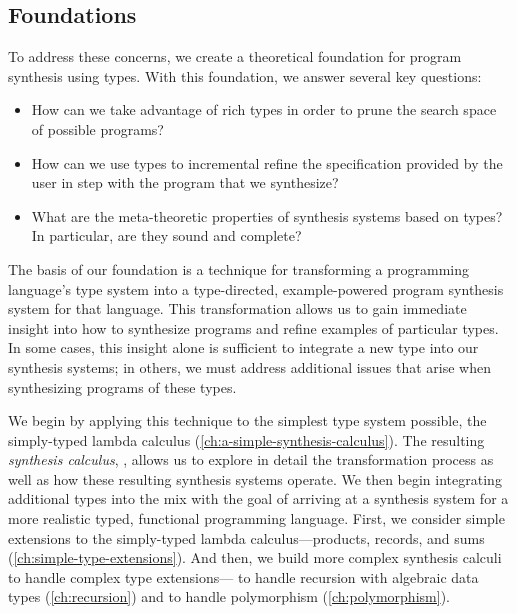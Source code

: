 \subsection{Foundations}
To address these concerns, we create a theoretical foundation for program synthesis using types.
With this foundation, we answer several key questions:
\begin{itemize}
  \item How can we take advantage of rich types in order to prune the search space of possible programs?
  \item How can we use types to incremental refine the specification provided by the user in step with the program that we synthesize?
  \item What are the meta-theoretic properties of synthesis systems based on types?  In particular, are they sound and complete?
\end{itemize}
The basis of our foundation is a technique for transforming a programming language's type system into a type-directed, example-powered program synthesis system for that language.
This transformation allows us to gain immediate insight into how to synthesize programs and refine examples of particular types.
In some cases, this insight alone is sufficient to integrate a new type into our synthesis systems; in others, we must address additional issues that arise when synthesizing programs of these types.

We begin by applying this technique to the simplest type system possible, the simply-typed lambda calculus (\autoref{ch:a-simple-synthesis-calculus}).
The resulting \emph{synthesis calculus}, \lsyn{}, allows us to explore in detail the transformation process as well as how these resulting synthesis systems operate.
We then begin integrating additional types into the mix with the goal of arriving at a synthesis system for a more realistic typed, functional programming language.
First, we consider simple extensions to the simply-typed lambda calculus---products, records, and sums (\autoref{ch:simple-type-extensions}).
And then, we build more complex synthesis calculi to handle complex type extensions---\mlsyn{} to handle recursion with algebraic data types (\autoref{ch:recursion}) and \systemfsyn{} to handle polymorphism (\autoref{ch:polymorphism}).

